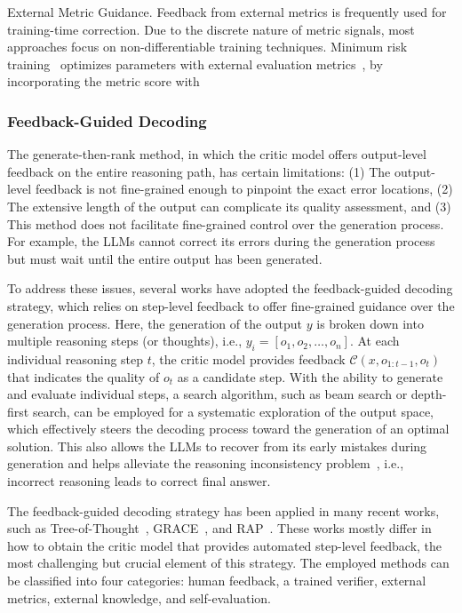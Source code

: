 \documentclass[12pt]{extarticle}
\begin{document}
External Metric Guidance. Feedback from external metrics is frequently used for training-time correction. Due to the discrete nature of metric signals, most approaches focus on non-differentiable training techniques. Minimum risk training~\cite{shen-etal-2016-minimum} optimizes parameters with external evaluation metrics~\cite{xu-etal-2022-errors, xu-etal-2023-sescore2}, by incorporating the metric score with

\subsubsection{Feedback-Guided Decoding}
The generate-then-rank method, in which the critic model offers output-level feedback on the entire reasoning path, has certain limitations: (1) The output-level feedback is not fine-grained enough to pinpoint the exact error locations, (2) The extensive length of the output can complicate its quality assessment, and (3) This method does not facilitate fine-grained control over the generation process. For example, the LLMs cannot correct its errors during the generation process but must wait until the entire output has been generated.

To address these issues, several works have adopted the feedback-guided decoding strategy, which relies on step-level feedback to offer fine-grained guidance over the generation process. Here, the generation of the output $y$ is broken down into multiple reasoning steps (or thoughts), i.e., $y_{i}=\left[o_{1}, o_{2}, \ldots, o_{n}\right]$. At each individual reasoning step $t$, the critic model provides feedback $\mathcal{C}\left(x, o_{1: t-1}, o_{t}\right)$ that indicates the quality of $o_{t}$ as a candidate step. With the ability to generate and evaluate individual steps, a search algorithm, such as beam search or depth-first search, can be employed for a systematic exploration of the output space, which effectively steers the decoding process toward the generation of an optimal solution. This also allows the LLMs to recover from its early mistakes during generation and helps alleviate the reasoning inconsistency problem~\cite{zelikman2022star, creswell2022faithful}, i.e., incorrect reasoning leads to correct final answer.

The feedback-guided decoding strategy has been applied in many recent works, such as Tree-of-Thought~\cite{yao2023tree}, GRACE~\cite{khalifa2023grace}, and RAP~\cite{hao2023reasoning}. These works mostly differ in how to obtain the critic model that provides automated step-level feedback, the most challenging but crucial element of this strategy. The employed methods can be classified into four categories: human feedback, a trained verifier, external metrics, external knowledge, and self-evaluation.
\end{document}
